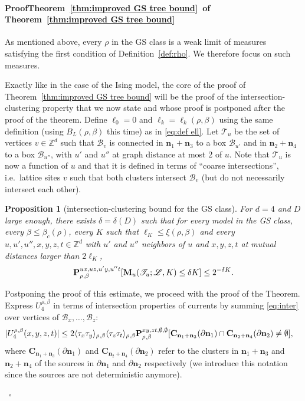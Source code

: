 \documentclass[a4paper,oneside,11pt]{article}
\def\Z{\mathbb{Z}}                          %
\newtheorem{proposition}[theorem]{Proposition}
\newcommand{\be}[1]{\begin{equation}\label{#1}}
\newcommand{\ee}{\end{equation}}
\numberwithin{equation}{section}
\numberwithin{equation}{section}
\numberwithin{equation}{section}
\newenvironment{proof}[1][\relax]%
  {\paragraph{Proof\ifx#1\relax\else~of #1\fi}}%
  {~\hfill$\square$\par\bigskip}
\newcommand{\calB}{\mathcal{B}}
\newcommand{\calL}{\mathcal{L}}
\newcommand{\calT}{\mathcal{T}}
\def\Z{\mathbb{Z}}                          %
\def\be{\begin{equation}}
\def\ee{\end{equation}}
\newcommand{\n}{\mathbf{n}}
\begin{document}
\begin{proof}[Theorem~\ref{thm:improved GS tree bound}] As mentioned above, every  $\rho$ in the GS class is a weak limit of measures satisfying the first condition of Definition~\ref{def:rho}.  We therefore focus on such measures. 

Exactly like in the case of the Ising model, the core of the proof of Theorem~\ref{thm:improved GS tree bound} will be 
the proof of the intersection-clustering property that we now state and whose proof is postponed after the proof of the theorem. Define $\ell_0=0$ and $\ell_k=\ell_k(\rho,\beta)$ using the same definition (using $B_L(\rho,\beta)$ this time) as in \eqref{eq:def ell}.  Let 
$\calT_u$ be the set of vertices $v\in\Z^d$ such that $\calB_v$ is connected in $\n_1+\n_3$ to a box $\calB_{u'}$ and in $\n_2+\n_4$ to a box $\calB_{u''}$, with $u'$ and $u''$ at graph distance at most 2 of $u$. Note that $\calT_u$ is now a function of $u$ and that it is defined in terms of ``coarse intersections'', i.e.~lattice sites  $v$ such that both clusters intersect $\calB_v$ (but do not necessarily intersect each other). 
 
\begin{proposition}[intersection-clustering bound for the GS class]\label{prop:non isolated G-S}  
For $d=4$ and $D$ large enough, there exists $\delta=\delta(D)$ such that  for every model in the GS class, every $\beta\le\beta_c(\rho)$,  every $K$ such that $\ell_{K}\le \xi(\rho,\beta)$ and every $u,u',u'',x,y,z,t\in\Z^d$ with $u'$ and $u''$ neighbors of $u$ and $x,y,z,t$ at mutual distances larger than $2\ell_{K}$,
\be \label{eq_cluster_GS}
{\bf P}^{ux,uz,u'y,u''t}_{\rho,\beta}[{\bf M}_u(\calT_u;\calL,K)\le \delta K]\le 2^{-\delta K}.
\ee 
\end{proposition}

Postponing the proof of this estimate, we proceed  with the proof of the Theorem. 
 Express $U_4^{\rho,\beta}$ in terms of intersection properties of currents by summing \eqref{eq:inter} over vertices of $\calB_x,\dots,\calB_z$:
 \begin{align}\label{eq:inter phi4} |U_4^{\rho,\beta}(x,y,z,t)|   & \leq    2\langle \tau_x\tau_y\rangle_{\rho,\beta}\langle \tau_z\tau_t\rangle_{\rho,\beta}{\bf P}^{xy,zt,\emptyset,\emptyset}_{\rho,\beta}[ {\mathbf C}_{\n_1+\n_3}(\partial\n_1)\cap{\mathbf C}_{\n_2+\n_4}(\partial\n_2)\ne \emptyset],\end{align}
 where ${\mathbf C}_{\n_1+\n_3}(\partial\n_1)$ and ${\mathbf C}_{\n_2+\n_4}(\partial\n_2)$ refer to the clusters in $\n_1+\n_3$ and $\n_2+\n_4$ of the sources in $\partial\n_1$ and $\partial\n_2$ respectively (we introduce this notation since the sources are not deterministic anymore).
 

\end{proof}
\end{document}
